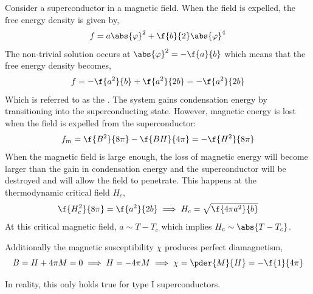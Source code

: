 \documentclass{article}
\newcommand{\vp}{\varphi}
\begin{document}
Consider a superconductor in a magnetic field. When the field is expelled, the free energy density is given by,
\[ f = a \abs{\vp}^2 + \f{b}{2}\abs{\vp}^4 \]
The non-trivial solution occurs at $\abs{\vp}^2 = - \f{a}{b}$ which means that the free energy density becomes,
\[ f = - \f{a^2}{b} + \f{a^2}{2 b} = -\f{a^2}{2b} \]
Which is referred to as the . The system gains condensation energy by transitioning into the superconducting state. However, magnetic energy is lost when the field is expelled from the superconductor:
\[ f_m = \f{B^2}{8\pi} - \f{BH}{4\pi} = - \f{H^2}{8 \pi} \]
When the magnetic field is large enough, the loss of magnetic energy will become larger than the gain in condensation energy and the superconductor will be destroyed and will allow the field to penetrate. This happens at the thermodynamic critical field $H_c$,
\[ \f{H_c^2}{8\pi} = \f{a^2}{2b} \implies H_c = \sqrt{\f{4 \pi a^2}{b}} \]
At this critical magnetic field, $a \sim T - T_c$ which implies $H_c \sim \abs{T - T_c}$.
\begin{center}
\end{center}
Additionally the magnetic susceptibility $\chi$ produces perfect diamagnetism,
\[ B = H + 4 \pi M = 0 \implies H = - 4 \pi M \implies \chi = \pder{M}{H} = -\f{1}{4\pi} \]
\begin{center}
\end{center}
In reality, this only holds true for type I superconductors. \\
\end{document}
